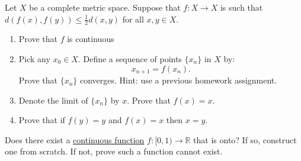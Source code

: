   \begin{exercise}
    Let $X$ be a complete metric space. Suppose that $f : X \to X$ is such that $d(f(x), f(y)) \leq \frac{1}{2}d(x, y)$ for all $x, y \in X$.
    \begin{enumerate}
      \item[(a)] Prove that $f$ is continuous
      
      \item[(b)] Pick any $x_0 \in X$. Define a sequence of points $\{x_n\}$ in $X$ by:
        \begin{equation}
          x_{n+1} = f(x_n).
        \end{equation}
        Prove that $\{x_n\}$ converges. Hint: use a previous homework assignment.
      
      \item[(c)] Denote the limit of $\{x_n\}$ by $x$. Prove that $f(x) = x$.
      
      \item[(d)] Prove that if $f(y) = y$ and $f(x) = x$ then $x = y$.
    \end{enumerate}
  \end{exercise}
  \begin{solution}

  \end{solution}

  \begin{exercise}
    Does there exist a \hyperref[pst-def:continuous_func]{continuous function} $f : [0, 1) \to \mathbb{R}$ that is onto? If so, construct one from scratch. If not, prove such a function cannot exist.
  \end{exercise}
  \begin{solution}

  \end{solution}

